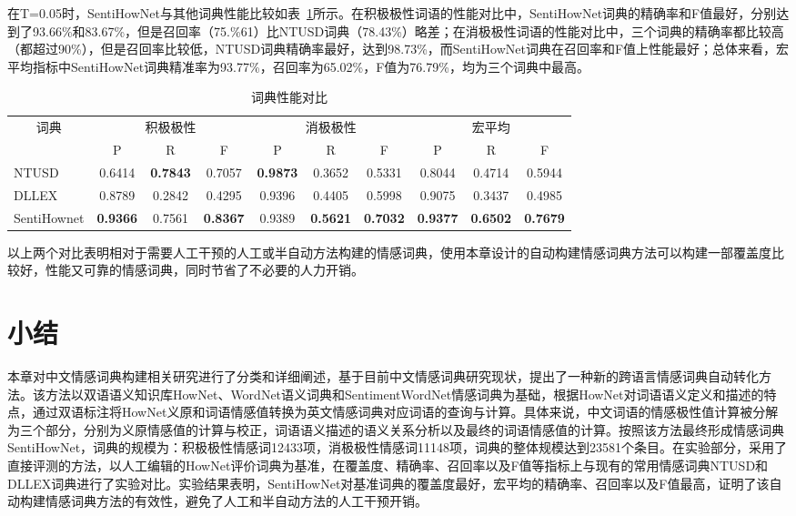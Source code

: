 在T=0.05时，SentiHowNet与其他词典性能比较如表~\ref{tab2-3}所示。在积极极性词语的性能对比中，SentiHowNet词典的精确率和F值最好，分别达到了93.66\%和83.67\%，但是召回率（75.\%61）比NTUSD词典（78.43\%）略差；在消极极性词语的性能对比中，三个词典的精确率都比较高（都超过90\%），但是召回率比较低，NTUSD词典精确率最好，达到98.73\%，而SentiHowNet词典在召回率和F值上性能最好；总体来看，宏平均指标中SentiHowNet词典精准率为93.77\%，召回率为65.02\%，F值为76.79\%，均为三个词典中最高。
\begin{table}[htp]
\centering
\caption{词典性能对比}
\label{tab2-3}
\begin{tabular}{|l|c|c|c|c|c|c|c|c|c|}
\hline
\multicolumn{1}{|c|}{\multirow{2}{*}{词典}} & \multicolumn{3}{c|}{积极极性} & \multicolumn{3}{c|}{消极极性} & \multicolumn{3}{c|}{宏平均} \\ \cline{2-10} 
\multicolumn{1}{|c|}{} & P & R & F & P & R & F & P & R & F \\ \hline
NTUSD & 0.6414 & \textbf{0.7843} & 0.7057 & \textbf{0.9873} & 0.3652 & 0.5331 & 0.8044 & 0.4714 & 0.5944 \\ \hline
DLLEX & 0.8789 & 0.2842 & 0.4295 & 0.9396 & 0.4405 & 0.5998 & 0.9075 & 0.3437 & 0.4985 \\ \hline
SentiHownet & \textbf{0.9366} & 0.7561 & \textbf{0.8367} & 0.9389 & \textbf{0.5621} & \textbf{0.7032} & \textbf{0.9377} & \textbf{0.6502} & \textbf{0.7679} \\ \hline
\end{tabular}
\end{table}

以上两个对比表明相对于需要人工干预的人工或半自动方法构建的情感词典，使用本章设计的自动构建情感词典方法可以构建一部覆盖度比较好，性能又可靠的情感词典，同时节省了不必要的人力开销。

\section{小结}
本章对中文情感词典构建相关研究进行了分类和详细阐述，基于目前中文情感词典研究现状，提出了一种新的跨语言情感词典自动转化方法。该方法以双语语义知识库HowNet、WordNet语义词典和SentimentWordNet情感词典为基础，根据HowNet对词语语义定义和描述的特点，通过双语标注将HowNet义原和词语情感值转换为英文情感词典对应词语的查询与计算。具体来说，中文词语的情感极性值计算被分解为三个部分，分别为义原情感值的计算与校正，词语语义描述的语义关系分析以及最终的词语情感值的计算。按照该方法最终形成情感词典SentiHowNet，词典的规模为：积极极性情感词12433项，消极极性情感词11148项，词典的整体规模达到23581个条目。在实验部分，采用了直接评测的方法，以人工编辑的HowNet评价词典为基准，在覆盖度、精确率、召回率以及F值等指标上与现有的常用情感词典NTUSD和DLLEX词典进行了实验对比。实验结果表明，SentiHowNet对基准词典的覆盖度最好，宏平均的精确率、召回率以及F值最高，证明了该自动构建情感词典方法的有效性，避免了人工和半自动方法的人工干预开销。
\newpage 
\mbox{} 
\newpage